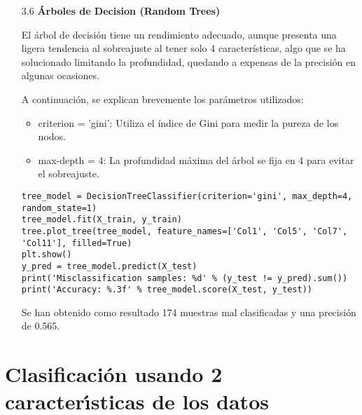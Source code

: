 \documentclass{article}
\begin{document}
\begin{itemize}

\item[3.6]  {\bf \'Arboles de Decision (Random Trees)}

El \'arbol de decisi\'on tiene un rendimiento adecuado, aunque presenta una ligera tendencia al sobreajuste al tener solo 4 caracter\'isticas, algo que se ha solucionado limitando la profundidad, quedando a expensas de la precisi\'on en algunas ocasiones.

A continuaci\'on, se explican brevemente los par\'ametros utilizados:

\begin{itemize}

\item
criterion = 'gini': Utiliza el \'indice de Gini para medir la pureza de los nodos.

\item
max-depth = 4: La profundidad m\'axima del árbol se fija en 4 para evitar el sobreajuste.

\end{itemize}

\begin{tcolorbox}[width=14cm]
\begin{scriptsize}
\begin{verbatim}
tree_model = DecisionTreeClassifier(criterion='gini', max_depth=4, random_state=1)
tree_model.fit(X_train, y_train)
tree.plot_tree(tree_model, feature_names=['Col1', 'Col5', 'Col7', 'Col11'], filled=True)
plt.show()
y_pred = tree_model.predict(X_test)
print('Misclassification samples: %d' % (y_test != y_pred).sum())
print('Accuracy: %.3f' % tree_model.score(X_test, y_test))
\end{verbatim}
\end{scriptsize}
\end{tcolorbox}

Se han obtenido como resultado 174 muestras mal clasificadas y una precisi\'on de 0.565.

\end{itemize}


\newpage

\section[4]{Clasificaci\'on usando 2 caracter\'{\i}sticas de los datos}
\end{document}

